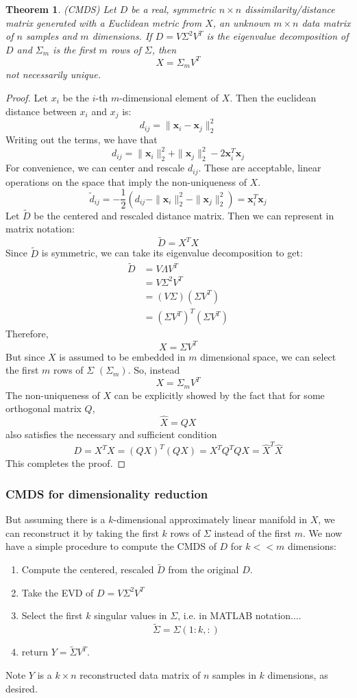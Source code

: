 \documentclass[11pt]{article}
\newtheorem{theorem}{Theorem}[section]
\begin{document}
\begin{multicols}{2}
\begin{theorem}
\emph{(CMDS)}
\label{CMDS}
Let $D$ be a real, symmetric $n \times n$ dissimilarity/distance matrix generated with a Euclidean metric from $X$, an unknown $m \times n$ data matrix of $n$ samples and $m$ dimensions. If $D=V \Sigma^2 V^T$ is the eigenvalue decomposition of $D$ and $\Sigma_m$ is the first $m$ rows of $\Sigma$, then
\[X = \Sigma_m V^T\]
not necessarily unique.
\end{theorem}
\begin{proof}
Let $x_i$ be the $i$-th $m$-dimensional element of $X$. Then the euclidean distance between $x_i$ and $x_j$ is:
\[d_{ij} = \| \mathbf{x}_i - \mathbf{x}_j \|_2^2\]
Writing out the terms, we have that
\[d_{ij} = \|\mathbf{x}_i\|_2^2 + \|\mathbf{x}_j\|_2^2 - 2 \mathbf{x}_i^T\mathbf{x}_j\]
For convenience, we can center and rescale $d_{ij}$. These are acceptable, linear operations on the space that imply the non-uniqueness of $X$.
\[\tilde d_{ij} = -\frac{1}{2} \left( d_{ij} - \|\mathbf{x}_i\|_2^2 - \|\mathbf{x}_j\|_2^2 \right) = \mathbf{x}_i^T\mathbf{x}_j \]
Let $\tilde D$ be the centered and rescaled distance matrix. Then we can represent in matrix notation:
\[\tilde D = X^TX\]
Since $\tilde D$ is symmetric, we can take its eigenvalue decomposition to get:
\begin{align*}
\tilde D &= V \Lambda V^T \\
&= V \Sigma^2 V^T \\
&= (V \Sigma ) (\Sigma V^T) \\
&= (\Sigma V^T)^T (\Sigma V^T)
\end{align*}
Therefore,
\[X = \Sigma V^T\]
But since $X$ is assumed to be embedded in $m$ dimensional space, we can select the first $m$ rows of $\Sigma$ $(\Sigma_m)$. So, instead
\[X = \Sigma_m V^T\]
The non-uniqueness of $X$ can be explicitly showed by the fact that for some orthogonal matrix $Q$,
\[\hat X = QX\]
also satisfies the necessary and sufficient condition
\[D = X^TX = (QX)^T(QX) = X^TQ^TQX = \hat X^T\hat X \]
This completes the proof.
\end{proof}

\subsubsection*{CMDS for dimensionality reduction}
But assuming there is a $k$-dimensional approximately linear manifold in $X$, we can reconstruct it by taking the first $k$ rows of $\Sigma$ instead of the first $m$. We now have a simple procedure to compute the CMDS of $D$ for $k << m$ dimensions:
\begin{enumerate}
\item Compute the centered, rescaled $\tilde D$ from the original $D$.
\item Take the EVD of $D = V \Sigma^2 V^T$
\item Select the first $k$ singular values in $\Sigma$, i.e. in MATLAB notation....
\[\tilde \Sigma = \Sigma(1:k, :)\]
\item return $Y = \tilde \Sigma V^T$.
\end{enumerate}
Note $Y$ is a $k \times n$ reconstructed data matrix of $n$ samples in $k$ dimensions, as desired.


\end{multicols}
\end{document}
